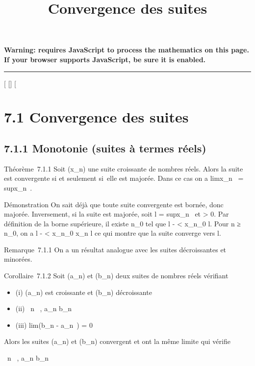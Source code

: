 \documentclass[]{article}
\title{Convergence des suites}
\author{}
\date{}
\begin{document}
\maketitle

\textbf{Warning: 
requires JavaScript to process the mathematics on this page.\\ If your
browser supports JavaScript, be sure it is enabled.}

\begin{center}\rule{3in}{0.4pt}\end{center}

[
[]
[

\section{7.1 Convergence des suites}

\subsection{7.1.1 Monotonie (suites à termes réels)}

Théorème~7.1.1 Soit (x_n) une suite croissante de nombres
réels. Alors la suite est convergente si et seulement si~elle est
majorée. Dans ce cas on a limx_n~
= supx_n~.

Démonstration On sait déjà que toute suite convergente est bornée, donc
majorée. Inversement, si la suite est majorée, soit l
= supx_n~ et \epsilon > 0. Par
définition de la borne supérieure, il existe n_0 tel que l - \epsilon
< x_n_0 \leq l. Pour n ≥ n_0, on a l -
\epsilon < x_n_0 \leq x_n \leq l ce qui montre
que la suite converge vers l.

Remarque~7.1.1 On a un résultat analogue avec les suites décroissantes
et minorées.

Corollaire~7.1.2 Soit (a_n) et (b_n) deux suites de
nombres réels vérifiant

\begin{itemize}
\itemsep1pt\parskip0pt
\item
  (i) (a_n) est croissante et (b_n) décroissante
\item
  (ii) \forall~n \in {}~, a_n \leq b_n~
\item
  (iii) lim(b_n - a_n~) = 0
\end{itemize}

Alors les suites (a_n) et (b_n) convergent et ont la
même limite \ell qui vérifie

\forall~n \in {}~, a_n \leq \ell \leq b_n~
\end{document}
